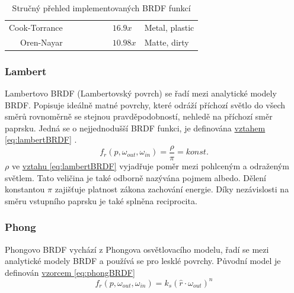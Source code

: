 \documentclass[czech,master,dept460,male,cpp,cpdeclaration]{diploma}
\newcommand{\uvec}[1]{\hat{#1}}
\newcommand{\alb}{\rho}
\newcommand{\true}{\ding{51}}
\newcommand{\false}{\ding{55}}
\begin{document}
\begin{table}[ht]
\begin{tabular}{r|lllllll}
        Cook-Torrance       & \true                    & \true                     & \true                       & \false                      & \false                   & \(16.9x\)                          & Metal, plastic                \\
        Oren-Nayar          & \true                    & \true                     & \false                      & \false                      & \true                    & \(10.98x\)                         & Matte, dirty                  \\
        \hline
    \end{tabular}
    \caption{Stručný přehled implementovaných BRDF funkcí}
    \label{tab:brdfProperties}
\end{table}

\subsubsection{Lambert} \label{sec:Lambert}
Lambertovo BRDF (Lambertovský povrch) se řadí mezi analytické modely BRDF. Popisuje ideálně matné povrchy, které odráží příchozí světlo do všech směrů rovnoměrně se stejnou pravděpodobností, nehledě na příchozí směr paprsku. Jedná se o nejjednodušší BRDF funkci, je definována \hyperref[eq:lambertBRDF]{vztahem \ref{eq:lambertBRDF}} \cite{Koppal2014}.
\begin{equation} \label{eq:lambertBRDF}
    f_r\left(p,\omega_{out},\omega_{in}\right) = \frac{\alb}{\pi} = konst.
\end{equation}
\(\alb\) ve \hyperref[eq:lambertBRDF]{vztahu \ref{eq:lambertBRDF}} vyjadřuje poměr mezi pohlceným a odraženým světlem. Tato veličina je také odborně nazývána pojmem albedo. Dělení konstantou \(\pi\) zajišťuje platnost zákona zachování energie. Díky nezávislosti na směru vstupního paprsku je také splněna reciprocita.

\subsubsection{Phong} \label{sec:Phong}
Phongovo BRDF vychází z Phongova osvětlovacího modelu, řadí se mezi analytické modely BRDF a používá se pro lesklé povrchy. Původní model je definován \hyperref[eq:phongBRDF]{vzorcem \ref{eq:phongBRDF}} \cite{Phong1975}
\begin{equation} \label{eq:phongBRDF}
    f_r\left(p,\omega_{out},\omega_{in}\right) = k_s(\uvec{r}\cdot\omega_{out})^n
\end{equation}
\end{document}
